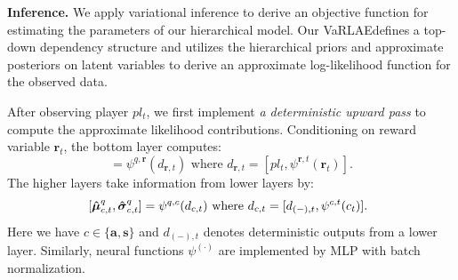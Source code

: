 \documentclass[letterpaper]{article} %
\newcommand{\context}{c}
\newcommand{\state}{\mathbf{s}}
\newcommand{\action}{\mathbf{a}}
\newcommand{\reward}{\boldsymbol{r}}
\newcommand{\player}{pl}
\newcommand{\system}{VaRLAE\;}
\begin{document}
{\bf Inference.}
We apply variational inference to derive an objective function for estimating the parameters of our hierarchical model. 
Our \system defines a top-down dependency structure and utilizes the hierarchical priors and approximate posteriors on latent variables to derive an approximate log-likelihood function for the observed data.

After observing player $\player_{t}$, 
we first implement {\it a deterministic upward pass} to compute the approximate likelihood contributions. Conditioning on reward variable $\reward_{t}$, the bottom layer computes:
\begin{equation}
    [\boldsymbol{\hat{\mu}}^{q}_{\reward,t},\boldsymbol{\hat{\sigma}}^{q}_{\reward,t}]=\psi^{q,\reward}(d_{\reward,t}) \text{ where } d_{\reward,t}=[\player_{t}, \psi^{\reward,t}(\reward_{t})].
\end{equation}
The higher layers take information from lower layers by:
\begin{equation}
    \hspace{-0.06in}[\boldsymbol{\hat{\mu}}^{q}_{\context,t},\boldsymbol{\hat{\sigma}}^{q}_{\context,t}]=\psi^{q,\context}(d_{\context,t}) \text{ where } d_{\context,t}=[d_{(-),t}, \psi^{\context,t}(\context_{t})].
\end{equation}
Here we have $\context\in\{\action,\state\}$ and $d_{(-),t}$ denotes deterministic outputs from a lower layer. Similarly, neural functions $\psi^{(\cdot)}$ are implemented by MLP with batch normalization. 
\end{document}
